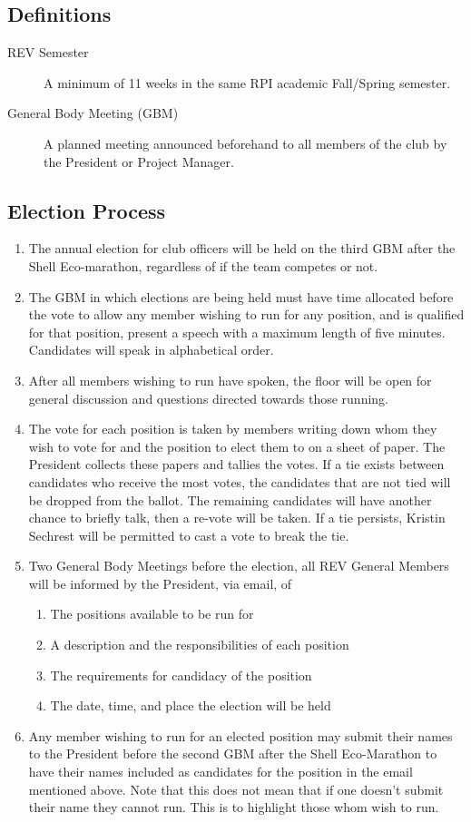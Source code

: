 \documentclass{article}
\begin{document}
\subsection{Definitions}
\label{roles:definitions}
\begin{description}
\item[REV Semester] A minimum of 11 weeks in the same RPI academic Fall/Spring semester.
\item[General Body Meeting (GBM)] A planned meeting announced beforehand to all members of the club by the President or Project Manager.
\end{description}

\subsection{Election Process}
\label{roles:process}
\begin{enumerate}
\item The annual election for club officers will be held on the third GBM after the Shell Eco-marathon, regardless of if the team competes or not.
\item The GBM in which elections are being held must have time allocated before the vote to allow any member wishing to run for any position, and is qualified for that position, present a speech with a maximum length of five minutes. Candidates will speak in alphabetical order.
\item After all members wishing to run have spoken, the floor will be open for general discussion and questions directed towards those running.
\item The vote for each position is taken by members writing down whom they wish to vote for and the position to elect them to on a sheet of paper. The President collects these papers and tallies the votes. If a tie exists between candidates who receive the most votes, the candidates that are not tied will be dropped from the ballot. The remaining candidates will have another chance to briefly talk, then a re-vote will be taken. If a tie persists, Kristin Sechrest will be permitted to cast a vote to break the tie.
\item Two General Body Meetings before the election, all REV General Members will be informed by the President, via email, of
    \begin{enumerate}
    \item The positions available to be run for
    \item A description and the responsibilities of each position
    \item The requirements for candidacy of the position
    \item The date, time, and place the election will be held
    \end{enumerate}
\item Any member wishing to run for an elected position may submit their names to the President before the second GBM after the Shell Eco-Marathon to have their names included as candidates for the position in the email mentioned above. Note that this does not mean that if one doesn't submit their name they cannot run. This is to highlight those whom wish to run.
\end{enumerate}
\end{document}
